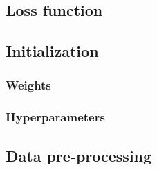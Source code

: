 \subsection{Loss function}

\subsection{Initialization}

\subsubsection{Weights}	

\subsubsection{Hyperparameters}

\subsection{Data pre-processing}


%

